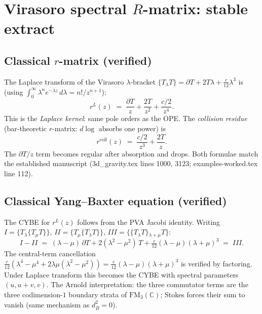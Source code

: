 \documentclass[11pt]{article}
\newcommand{\barB}{\overline{B}}
\newcommand{\C}{\mathbb{C}}
\newcommand{\FM}{\mathrm{FM}}
\begin{document}
\section{Virasoro spectral $R$-matrix: stable extract}
\label{sec:virasoro-spectral-R-stable}
%

\subsection*{Classical $r$-matrix (verified)}

The Laplace transform of the Virasoro $\lambda$-bracket
$\{T{}_\lambda T\} = \partial T + 2T\lambda + \frac{c}{12}\lambda^3$
is (using $\int_0^\infty \lambda^n e^{-\lambda z}\,d\lambda = n!/z^{n+1}$):
\begin{equation}\label{eq:vir-rL-stable}
r^L(z)
\;=\;
\frac{\partial T}{z}
+ \frac{2T}{z^2}
+ \frac{c/2}{z^4}.
\end{equation}
This is the \emph{Laplace kernel}: same pole orders as the OPE.
The \emph{collision residue} (bar-theoretic $r$-matrix: $d\log$
absorbs one power) is
\begin{equation}\label{eq:vir-rcoll-stable}
r^{\mathrm{coll}}(z)
\;=\;
\frac{c/2}{z^3} + \frac{2T}{z}.
\end{equation}
The $\partial T/z$ term becomes regular after absorption and drops.
Both formulae match the established manuscript (3d\_gravity.tex
lines 1000, 3123; examples-worked.tex line 112).

\subsection*{Classical Yang--Baxter equation (verified)}

The CYBE for $r^L(z)$ follows from the PVA Jacobi identity.
Writing $I = \{T{}_\lambda\{T{}_\mu T\}\}$,
$II = \{T{}_\mu\{T{}_\lambda T\}\}$,
$III = \{\{T{}_\lambda T\}{}_{\lambda+\mu} T\}$:
\[
I - II
\;=\;
(\lambda-\mu)\,\partial T
+ 2(\lambda^2-\mu^2)\,T
+ \tfrac{c}{12}(\lambda-\mu)(\lambda+\mu)^3
\;=\; III.
\]
The central-term cancellation
$\frac{c}{12}(\lambda^4 - \mu^4 + 2\lambda\mu(\lambda^2 - \mu^2))
= \frac{c}{12}(\lambda-\mu)(\lambda+\mu)^3$
is verified by factoring.  Under Laplace transform this becomes the
CYBE with spectral parameters $(u, u+v, v)$.  The Arnold
interpretation: the three commutator terms are the three
codimension-$1$ boundary strata of $\FM_3(\C)$; Stokes forces their
sum to vanish (same mechanism as $d_{\barB}^2 = 0$).
\end{document}
